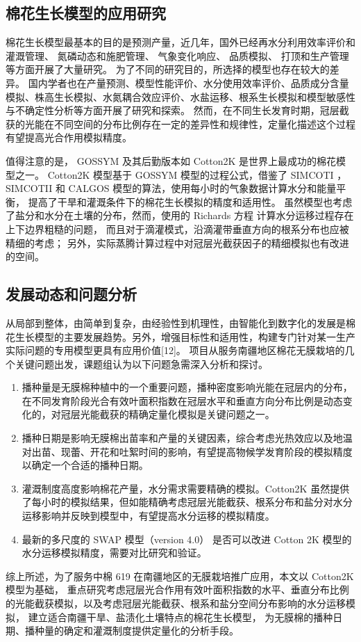 \subsection{棉花生长模型的应用研究}

棉花生长模型最基本的目的是预测产量，近几年，国外已经再水分利用效率评价和灌溉管理\cite{baumhardt2014,booker2014,booker2015,modala2015,thorp2015,anapalli2016,attia2016,linker2016,tsakmakis2018,thorp2019,thorp2020,thorp2020a}、
氮磷动态和施肥管理\cite{shumway2012,amin2017,arshad2017,zurweller2019}、
气象变化响应、
品质模拟、
打顶和生产管理\cite{yang2008}等方面开展了大量研究。
为了不同的研究目的，所选择的模型也存在较大的差异。
国内学者也在产量预测、模型性能评价、水分使用效率评价、品质成分含量模拟、株高生长模拟、水氮耦合效应评价、水盐运移、根系生长模拟和模型敏感性与不确定性分析等方面开展了研究和探索。
然而，在不同生长发育时期，冠层截获的光能在不同空间的分布比例存在一定的差异性和规律性，定量化描述这个过程有望提高光合作用模拟精度。

值得注意的是， GOSSYM 及其后勤版本如 Cotton2K 是世界上最成功的棉花模型之一。
Cotton2K 模型基于 GOSSYM 模型的过程公式，借鉴了 SIMCOTI ， SIMCOTII 和 CALGOS 模型的算法，使用每小时的气象数据计算水分和能量平衡，
提高了干旱和灌溉条件下的棉花生长模拟的精度和适用性。
虽然模型也考虑了盐分和水分在土壤的分布，然而，使用的 Richards 方程 \cite{richards1931} 计算水分运移过程存在上下边界粗糙的问题，
而且对于滴灌模式，沿滴灌带垂直方向的根系分布也应被精细的考虑；
另外，实际蒸腾计算过程中对冠层光截获因子的精细模拟也有改进的空间。

\subsection{发展动态和问题分析}
从局部到整体，由简单到复杂，由经验性到机理性，由智能化到数字化的发展是棉花生长模型的主要发展趋势。另外，增强目标性和适用性，构建专门针对某一生产实际问题的专用模型更具有应用价值[12]。
项目从服务南疆地区棉花无膜栽培的几个关键问题出发，课题组认为以下问题急需深入分析和探讨。

\begin{enumerate}
    \item 播种量是无膜棉种植中的一个重要问题，播种密度影响光能在冠层内的分布，在不同发育阶段光合有效叶面积指数在冠层水平和垂直方向分布比例是动态变化的，对冠层光能截获的精确定量化模拟是关键问题之一。
    \item 播种日期是影响无膜棉出苗率和产量的关键因素，综合考虑光热效应以及地温对出苗、现蕾、开花和吐絮时间的影响，有望提高物候学发育阶段的模拟精度以确定一个合适的播种日期。
    \item 灌溉制度高度影响棉花产量，水分需求需要精确的模拟。Cotton2K 虽然提供了每小时的模拟结果，但如能精确考虑冠层光能截获、根系分布和盐分对水分运移影响并反映到模型中，有望提高水分运移的模拟精度。
    \item 最新的多尺度的 SWAP 模型（version 4.0）\cite{swap2021} 是否可以改进 Cotton 2K 模型的水分运移模拟精度，需要对比研究和验证。
\end{enumerate}

综上所述，为了服务中棉 619 在南疆地区的无膜栽培推广应用，本文以 Cotton2K 模型为基础，
重点研究考虑冠层光合作用有效叶面积指数的水平、垂直分布比例的光能截获模拟，以及考虑冠层光能截获、根系和盐分空间分布影响的水分运移模拟，
建立适合南疆干旱、盐渍化土壤特点的棉花生长模型，
为无膜棉的播种日期、播种量的确定和灌溉制度提供定量化的分析手段。
